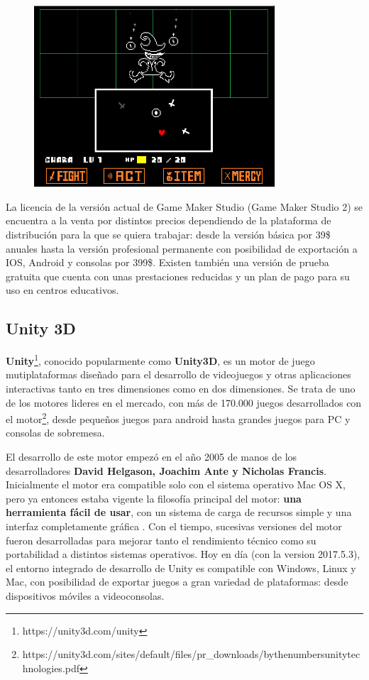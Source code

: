 \begin{figure}[h]
	\includegraphics[width=0.8\textwidth]{images/estadodelarte/motores/undertale}
	\centering
	\caption{}
	\label{undertale}
\end{figure}

La licencia de la versión actual de Game Maker Studio (Game Maker Studio 2) se encuentra a la venta por distintos precios dependiendo de la plataforma de distribución para la que se quiera trabajar: desde la versión básica por 39\$ anuales hasta la versión profesional permanente con posibilidad de exportación a IOS, Android y consolas por 399\$. Existen también una versión de prueba gratuita que cuenta con unas prestaciones reducidas y un plan de pago para su uso en centros educativos.

\subsection{Unity 3D}
\textbf{Unity}\footnote{https://unity3d.com/unity}, conocido popularmente como \textbf{Unity3D}, es un motor de juego mutiplataformas diseñado para el desarrollo de videojuegos y otras aplicaciones interactivas tanto en tres dimensiones como en dos dimensiones. Se trata de uno de los motores lideres en el mercado, con más de 170.000 juegos desarrollados con el motor\footnote{https://unity3d.com/sites/default/files/pr\_downloads/bythenumbersunitytechnologies.pdf}, desde pequeños juegos para android hasta grandes juegos para PC y consolas de sobremesa.

El desarrollo de este motor empezó en el año 2005 de manos de los desarrolladores \textbf{David Helgason, Joachim Ante y Nicholas Francis}. Inicialmente el motor era compatible solo con el sistema operativo Mac OS X, pero ya entonces estaba vigente la filosofía principal del motor: \textbf{una herramienta fácil de usar}, con un sistema de carga de recursos simple y una interfaz completamente gráfica \cite{unity_story}. Con el tiempo, sucesivas versiones del motor fueron desarrolladas para mejorar tanto el rendimiento técnico como su portabilidad a distintos sistemas operativos. Hoy en día (con la version 2017.5.3), el entorno integrado de desarrollo de Unity es compatible con Windows, Linux y Mac, con posibilidad de exportar juegos a gran variedad de plataformas: desde dispositivos móviles a videoconsolas.

